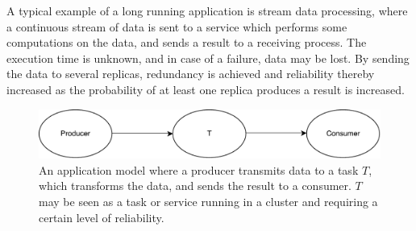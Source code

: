 \documentclass{cslthse-msc}
\begin{document}
A typical example of a long running application is stream data processing, where a continuous stream of data is sent to a service which performs some computations on the data, and sends a result to a receiving process. The execution time is unknown, and in case of a failure, data may be lost. By sending the data to several replicas, redundancy is achieved and reliability thereby increased as the probability of at least one replica produces a result is increased.

\begin{figure}[!hbt]
\centering
\includegraphics[scale=0.5]{images/app_model.pdf} 
\caption[Application model]{An application model where a producer transmits data to a task $T$, which transforms the data, and sends the result to a consumer. $T$ may be seen as a task or service running in a cluster and requiring a certain level of reliability.}\label{fig:app_model}
\end{figure}

\iffalse
\end{document}
